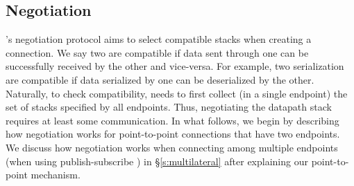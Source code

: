 \subsection{Negotiation}\label{s:negotiation}

\name's negotiation protocol aims to select compatible \tunnel stacks when creating a connection. We say two \tunnels are compatible if data sent through one can be successfully received by the other and vice-versa. For example, two serialization \tunnels are compatible if data serialized by one can be deserialized by the other. Naturally, to check compatibility, \name needs to first collect (in a single endpoint) the set of \tunnel stacks specified by all endpoints. Thus, negotiating the datapath stack requires at least some communication. In what follows, we begin by describing how negotiation works for point-to-point connections that have two endpoints. We discuss how negotiation works when connecting among multiple endpoints (\eg when using publish-subscribe \tunnels) in \S\ref{s:multilateral} after explaining our point-to-point mechanism.

